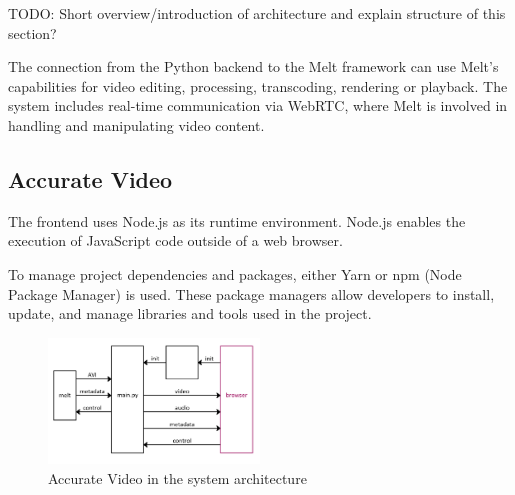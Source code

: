\documentclass[12pt,a4paper]{article}
\begin{document}
TODO: Short overview/introduction of architecture and explain structure of this section?





The connection from the Python backend to the Melt framework can use Melt's capabilities for video editing, processing, transcoding, rendering or playback. The system includes real-time communication via WebRTC, where Melt is involved in handling and manipulating video content.














\subsection{Accurate Video} \label{subsection:accuratevideo}


The frontend uses Node.js as its runtime environment. Node.js enables the execution of JavaScript code outside of a web browser.~\cite{nodejs, RM_Frontend, ap3_docs}

To manage project dependencies and packages, either Yarn or npm (Node Package Manager) is used. These package managers allow developers to install, update, and manage libraries and tools used in the project.~\cite{RM_Frontend, npmyarn}


\begin{figure}[H]
	\centering
	\includegraphics[width=0.5\textwidth]{IM_FE.png}
	\caption{Accurate Video in the system architecture}
\end{figure}
\end{document}
